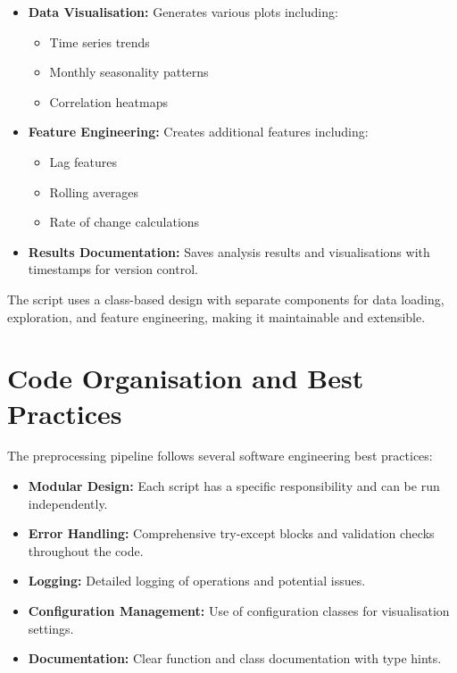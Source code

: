 \documentclass[12pt,a4paper]{report}
\begin{document}
\begin{itemize}
    \item \textbf{Data Visualisation:} Generates various plots including:
    \begin{itemize}
        \item Time series trends
        \item Monthly seasonality patterns
        \item Correlation heatmaps
    \end{itemize}
    \item \textbf{Feature Engineering:} Creates additional features including:
    \begin{itemize}
        \item Lag features
        \item Rolling averages
        \item Rate of change calculations
    \end{itemize}
    \item \textbf{Results Documentation:} Saves analysis results and visualisations with timestamps for version control.
\end{itemize}

The script uses a class-based design with separate components for data loading, exploration, and feature engineering, making it maintainable and extensible.

\section{Code Organisation and Best Practices}

The preprocessing pipeline follows several software engineering best practices:

\begin{itemize}
    \item \textbf{Modular Design:} Each script has a specific responsibility and can be run independently.
    \item \textbf{Error Handling:} Comprehensive try-except blocks and validation checks throughout the code.
    \item \textbf{Logging:} Detailed logging of operations and potential issues.
    \item \textbf{Configuration Management:} Use of configuration classes for visualisation settings.
    \item \textbf{Documentation:} Clear function and class documentation with type hints.
\end{itemize}
\end{document}
